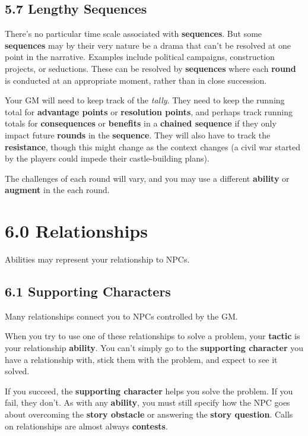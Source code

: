 \documentclass[
  11pt,
]{article}
\begin{document}
\hypertarget{lengthy-sequences}{%
\subsection{5.7 Lengthy Sequences}\label{lengthy-sequences}}

There's no particular time scale associated with \textbf{sequences}. But
some \textbf{sequences} may by their very nature be a drama that can't
be resolved at one point in the narrative. Examples include political
campaigns, construction projects, or seductions. These can be resolved
by \textbf{sequences} where each \textbf{round} is conducted at an
appropriate moment, rather than in close succession.

Your GM will need to keep track of the \emph{tally}. They need to keep
the running total for \textbf{advantage points} or \textbf{resolution
points}, and perhaps track running totals for \textbf{consequences} or
\textbf{benefits} in a \textbf{chained sequence} if they only impact
future \textbf{rounds} in the \textbf{sequence}. They will also have to
track the \textbf{resistance}, though this might change as the context
changes (a civil war started by the players could impede their
castle-building plans).

The challenges of each round will vary, and you may use a different
\textbf{ability} or \textbf{augment} in the each round.

\hypertarget{relationships}{%
\section{6.0 Relationships}\label{relationships}}

Abilities may represent your relationship to NPCs.

\hypertarget{supporting-characters}{%
\subsection{6.1 Supporting Characters}\label{supporting-characters}}

Many relationships connect you to NPCs controlled by the GM.

When you try to use one of these relationships to solve a problem, your
\textbf{tactic} is your relationship \textbf{ability}. You can't simply
go to the \textbf{supporting character} you have a relationship with,
stick them with the problem, and expect to see it solved.

If you succeed, the \textbf{supporting character} helps you solve the
problem. If you fail, they don't. As with any \textbf{ability}, you must
still specify how the NPC goes about overcoming the \textbf{story
obstacle} or answering the \textbf{story question}. Calls on
relationships are almost always \textbf{contests}.
\end{document}
